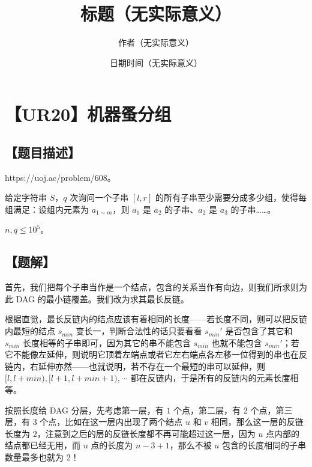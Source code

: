 \documentclass[UTF8,12pt,a4paper]{ctexart}
\title{标题（无实际意义）}
\author{作者（无实际意义）}
\date{日期时间（无实际意义）}
\begin{document}
	\fontsize{12pt}{12pt}\selectfont
	
	\newpage
	\pagestyle{fancy}
	
	
	
	\section*{【UR20】机器蚤分组}
	
	\subsection*{【题目描述】}
	
	https://uoj.ac/problem/608。
	
	给定字符串 $S$，$q$ 次询问一个子串 $[l,r]$ 的所有子串至少需要分成多少组，使得每组满足：设组内元素为 $a_{1\sim m}$，则 $a_1$ 是 $a_2$ 的子串、$a_2$ 是 $a_3$ 的子串……。
	
	$n,q\le 10^5$。
	
	
	\subsection*{【题解】}
	
	首先，我们把每个子串当作是一个结点，包含的关系当作有向边，则我们所求则为此 DAG 的最小链覆盖。我们改为求其最长反链。
	
	根据直觉，最长反链内的结点应该有着相同的长度——若长度不同，则可以把反链内最短的结点 $s_{min}$ 变长一，判断合法性的话只要看看 $s_{min}'$ 是否包含了其它和 $s_{min}$ 长度相等的子串即可，因为其它的串不能包含 $s_{min}$ 也就不能包含 $s_{min}'$；若它不能像左延伸，则说明它顶着左端点或者它左右端点各左移一位得到的串也在反链内，右延伸亦然——也就说明，若不存在一个最短的串可以延伸，则 $[l,l+min),[l+1,l+min+1),\cdots$ 都在反链内，于是所有的反链内的元素长度相等。
	
	按照长度给 DAG 分层，先考虑第一层，有 $1$ 个点，第二层，有 $2$ 个点，第三层，有 $3$ 个点，比如在这一层内出现了两个结点 $u$ 和 $v$ 相同，那么这一层的反链长度为 $2$，注意到之后的层的反链长度都不再可能超过这一层，因为 $u$ 点内部的结点都已经无用，而 $u$ 点的长度为 $n-3+1$，那么不被 $u$ 包含的长度相同的子串数量最多也就为 $2$！
	
\end{document}
